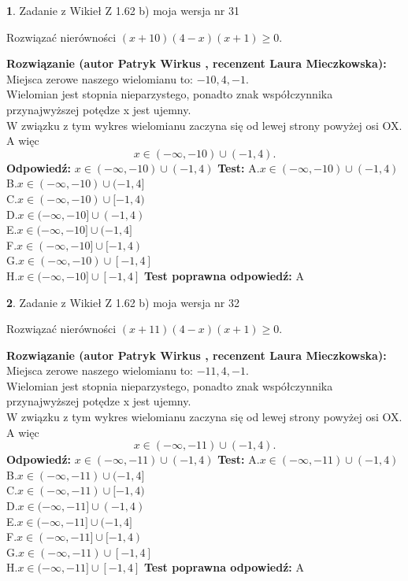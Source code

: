 \documentclass[12pt, a4paper]{article}
\theoremstyle{definition} %
\newtheorem{zad}{}
\newcommand{\zadStart}[1]{\begin{zad}#1\newline}
\newcommand{\zadStop}{\end{zad}}
\newcommand{\rozwStart}[2]{\noindent \textbf{Rozwiązanie (autor #1 , recenzent #2): }\newline}
\newcommand{\rozwStop}{\newline}
\newcommand{\odpStart}{\noindent \textbf{Odpowiedź:}\newline}
\newcommand{\odpStop}{\newline}
\newcommand{\testStart}{\noindent \textbf{Test:}\newline}
\newcommand{\testStop}{\newline}
\newcommand{\kluczStart}{\noindent \textbf{Test poprawna odpowiedź:}\newline}
\newcommand{\kluczStop}{\newline}
\begin{document}
\zadStart{Zadanie z Wikieł Z 1.62 b) moja wersja nr 31}

Rozwiązać nierówności $(x+10)(4-x)(x+1)\ge0$.
\zadStop
\rozwStart{Patryk Wirkus}{Laura Mieczkowska}
Miejsca zerowe naszego wielomianu to: $-10, 4, -1$.\\
Wielomian jest stopnia nieparzystego, ponadto znak współczynnika przy\linebreak najwyższej potędze x jest ujemny.\\ W związku z tym wykres wielomianu zaczyna się od lewej strony powyżej osi OX. A więc $$x \in (-\infty,-10) \cup (-1,4).$$
\rozwStop
\odpStart
$x \in (-\infty,-10) \cup (-1,4)$
\odpStop
\testStart
A.$x \in (-\infty,-10) \cup (-1,4)$\\
B.$x \in (-\infty,-10) \cup (-1,4]$\\
C.$x \in (-\infty,-10) \cup [-1,4)$\\
D.$x \in (-\infty,-10] \cup (-1,4)$\\
E.$x \in (-\infty,-10] \cup (-1,4]$\\
F.$x \in (-\infty,-10] \cup [-1,4)$\\
G.$x \in (-\infty,-10) \cup [-1,4]$\\
H.$x \in (-\infty,-10] \cup [-1,4]$
\testStop
\kluczStart
A
\kluczStop



\zadStart{Zadanie z Wikieł Z 1.62 b) moja wersja nr 32}

Rozwiązać nierówności $(x+11)(4-x)(x+1)\ge0$.
\zadStop
\rozwStart{Patryk Wirkus}{Laura Mieczkowska}
Miejsca zerowe naszego wielomianu to: $-11, 4, -1$.\\
Wielomian jest stopnia nieparzystego, ponadto znak współczynnika przy\linebreak najwyższej potędze x jest ujemny.\\ W związku z tym wykres wielomianu zaczyna się od lewej strony powyżej osi OX. A więc $$x \in (-\infty,-11) \cup (-1,4).$$
\rozwStop
\odpStart
$x \in (-\infty,-11) \cup (-1,4)$
\odpStop
\testStart
A.$x \in (-\infty,-11) \cup (-1,4)$\\
B.$x \in (-\infty,-11) \cup (-1,4]$\\
C.$x \in (-\infty,-11) \cup [-1,4)$\\
D.$x \in (-\infty,-11] \cup (-1,4)$\\
E.$x \in (-\infty,-11] \cup (-1,4]$\\
F.$x \in (-\infty,-11] \cup [-1,4)$\\
G.$x \in (-\infty,-11) \cup [-1,4]$\\
H.$x \in (-\infty,-11] \cup [-1,4]$
\testStop
\kluczStart
A
\kluczStop
\end{document}
